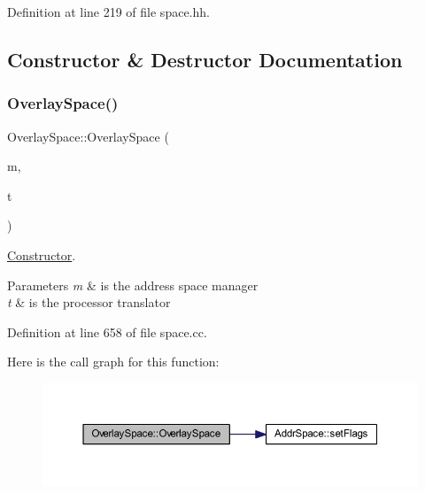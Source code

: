 Definition at line 219 of file space.\+hh.



\subsection{Constructor \& Destructor Documentation}
\mbox{\label{class_overlay_space_a4ff9ec9fa7ed004c685f6f34c9978c09}} 
\subsubsection{\texorpdfstring{OverlaySpace()}{OverlaySpace()}}
{\footnotesize\ttfamily Overlay\+Space\+::\+Overlay\+Space (\begin{DoxyParamCaption}\item[{\mbox{\hyperlink{class_addr_space_manager}{Addr\+Space\+Manager}} $\ast$}]{m,  }\item[{const \mbox{\hyperlink{class_translate}{Translate}} $\ast$}]{t }\end{DoxyParamCaption})}



\mbox{\hyperlink{class_constructor}{Constructor}}. 


\begin{DoxyParams}{Parameters}
{\em m} & is the address space manager \\
\hline
{\em t} & is the processor translator \\
\hline
\end{DoxyParams}


Definition at line 658 of file space.\+cc.

Here is the call graph for this function\+:
\nopagebreak
\begin{figure}[H]
\begin{center}
\leavevmode
\includegraphics[width=350pt]{class_overlay_space_a4ff9ec9fa7ed004c685f6f34c9978c09_cgraph}
\end{center}
\end{figure}



